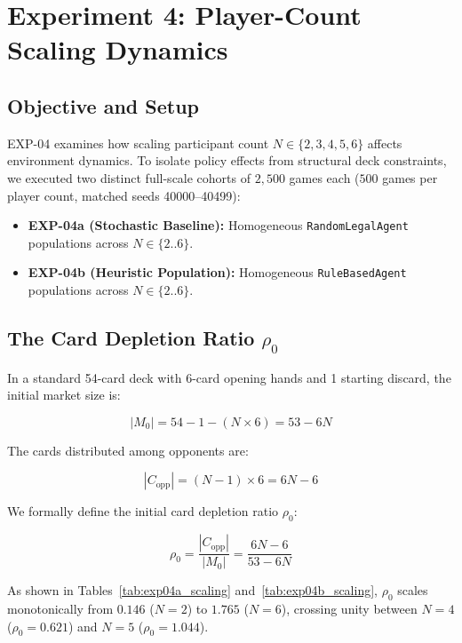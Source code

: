\documentclass[11pt]{article}
\begin{document}
\section{Experiment 4: Player-Count Scaling Dynamics}

\subsection{Objective and Setup}
EXP-04 examines how scaling participant count $N \in \{2, 3, 4, 5, 6\}$ affects environment dynamics. To isolate policy effects from structural deck constraints, we executed two distinct full-scale cohorts of $2{,}500$ games each ($500$ games per player count, matched seeds 40000--40499):
\begin{itemize}
  \item \textbf{EXP-04a (Stochastic Baseline):} Homogeneous \texttt{RandomLegalAgent} populations across $N \in \{2..6\}$.
  \item \textbf{EXP-04b (Heuristic Population):} Homogeneous \texttt{RuleBasedAgent} populations across $N \in \{2..6\}$.
\end{itemize}

\subsection{The Card Depletion Ratio \texorpdfstring{$\rho_0$}{rho\_0}}
In a standard 54-card deck with 6-card opening hands and 1 starting discard, the initial market size is:

\[
|M_0| = 54 - 1 - (N \times 6) = 53 - 6N
\]

The cards distributed among opponents are:

\[
|C_{\text{opp}}| = (N - 1) \times 6 = 6N - 6
\]

We formally define the initial card depletion ratio $\rho_0$:

\[
\rho_0 = \frac{|C_{\text{opp}}|}{|M_0|} = \frac{6N - 6}{53 - 6N}
\]

As shown in Tables~\ref{tab:exp04a_scaling} and~\ref{tab:exp04b_scaling}, $\rho_0$ scales monotonically from $0.146$ ($N=2$) to $1.765$ ($N=6$), crossing unity between $N=4$ ($\rho_0 = 0.621$) and $N=5$ ($\rho_0 = 1.044$).
\end{document}
